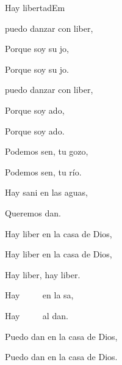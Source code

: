 \documentclass[12pt, spanish]{book}
\begin{document}
\begin{song}{Hay libertad}{Em}
        \begin{SBExtraKeys}{

            \begin{SBOpGroup}
                 puedo danzar con liber,

                Porque soy su jo,

                Porque soy su jo.
            \end{SBOpGroup}

            \begin{SBOpGroup}
                 puedo danzar con liber,

                Porque soy ado,

                Porque soy ado.
            \end{SBOpGroup}


            \begin{SBOpGroup}
                Podemos sen, tu gozo,

                Podemos sen, tu río.

                Hay sani en las aguas,

                Queremos dan.    
            \end{SBOpGroup}

            \begin{SBChorus}
                Hay liber en la casa de Dios,

                Hay liber en la casa de Dios,

                Hay liber, hay liber.
            \end{SBChorus}

            \begin{SBOpGroup}
                Hay ~~~~ en la sa,

                Hay ~~~~ al dan.
            \end{SBOpGroup}


            \begin{SBChorus}
                Puedo dan en la casa de Dios,

                Puedo dan en la casa de Dios.


\end{SBChorus}}
\end{SBExtraKeys}
\end{song}
\end{document}
